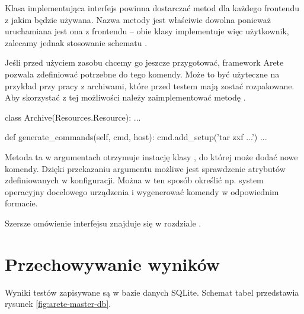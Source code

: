 \documentclass[00-praca-magisterska.tex]{subfiles}
\begin{document}

Klasa implementująca interfejs  powinna dostarczać metod
 dla każdego frontendu z jakim będzie używana. Nazwa
metody jest właściwie dowolna ponieważ uruchamiana jest ona z frontendu -- obie
klasy implementuje więc użytkownik, zalecamy jednak stosowanie schematu
.

Jeśli przed użyciem zasobu chcemy go jeszcze przygotować, framework Arete
pozwala zdefiniować potrzebne do tego komendy. Może to być użyteczne na
przykład przy pracy z archiwami, które przed testem mają zostać rozpakowane. Aby
skorzystać z tej możliwości należy zaimplementować metodę
.

\begin{pythoncode}
  class Archive(Resources.Resource):
      ...

      def generate_commands(self, cmd, host):
          cmd.add_setup('tar zxf ...')
	  ...
\end{pythoncode}

Metoda ta w argumentach otrzymuje instację klasy , do której
może dodać nowe komendy. Dzięki przekazaniu argumentu  możliwe jest
sprawdzenie atrybutów zdefiniowanych w konfiguracji. Można w ten sposób
określić np. system operacyjny docelowego urządzenia i wygenerować komendy w
odpowiednim formacie.

Szersze omówienie interfejsu  znajduje się w rozdziale
.

\section{Przechowywanie wyników}

Wyniki testów zapisywane są w bazie danych SQLite. Schemat tabel przedstawia
rysunek \ref{fig:arete-master-db}.
\end{document}
